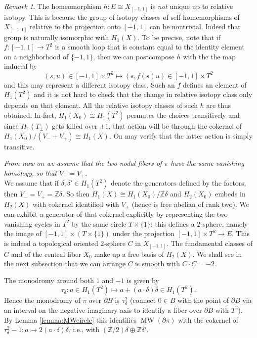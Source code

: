 \documentclass[10pt,letterpaper]{amsart}
\numberwithin{equation}{section}
\def\ZZ{{\mathbb Z}}
\newcommand{\p}{\partial}
\newcommand\MW{\operatorname{MW}}
\theoremstyle{remark}
\newtheorem{remark}[theorem]{Remark}
\begin{document}
\begin{remark}\label{rem:nonunique}
The homeomorphism $h:E\cong X_{[-1,1]}$ is \emph{not} unique up to relative isotopy. This is because the group of
 isotopy classes of self-homemorphisms of $X_{[-1,1]}$ relative to the projection onto $[-1,1]$ can be nontrivial. Indeed that group is naturally isomorphic with $H_1(X)$.
To be precise, note that if $f: [-1,1]\to T^2$ is a smooth loop that is  constant equal to the identity element on  a neighborhood of $\{-1,1\}$, then we can postcompose $h$ with the 
the map induced by 
\[
(s,  {u})\in [-1,1]\times T^2\mapsto (s, f(s){u})\in [-1,1]\times T^2
\]
and this may represent a different isotopy class. Such an $f$ defines an element of $H_1(T^2)$ and it is  
not hard to check that the change in relative isotopy class only depends on that element. 
All the relative isotopy classes  of such $h$ are thus obtained. In fact,  $H_1(X_0)\cong H_1(T^2)$ permutes the choices transitively  and 
since $H_1(T_\pm)$ gets killed over $\pm 1$, that action will be  through the cokernel of 
$H_1(X_0)/(V_-+V_+)\cong H_1(X)$. On may verify that the  latter action is simply transitive. 
\end{remark}

\emph{From now on we assume that the two nodal   fibers of $\pi$ have the same vanishing homology, so that $V_-=V_+$.} 
\\

We assume that  if  $\delta,\delta'\in H_1(T^2)$ denote the generators defined by the factors, then $V_-=V_+=\ZZ\delta$. So then $H_1(X)\cong H_1(X_0)/\ZZ \delta$ and  $H_2(X_0)$ embeds in $H_2(X)$ with cokernel identified with $V_+$ (hence is free abelian of rank two).  We  can  exhibit a generator of that cokernel explicitly  by representing the two vanishing cycles in $T^2$  by 
the same circle $T\times\{1\}$: this defines a   $2$-sphere, namely the image of $[-1,1]\times (T\times\{1\})$ under the projection $[-1,1]\times T^2\to E$. This is indeed a topological oriented $2$-sphere  $C$ in $X_{[-1,1]}$. The fundamental classes of $C$ and of the central fiber $X_0$ make up a free basis of $H_2(X)$. We shall see in the next subsection that we can arrange $C$ is smooth with $C\cdot C=-2$.


The monodromy around both $1$ and $-1$ is given by 
\[
\tau_{\delta}: a\in H_1(T^2)\mapsto a+(a\cdot \delta)\delta \in H_1(T^2).
\]
Hence the  monodromy of $\pi$ over $\p B$  is $\tau_{\delta}^2$ (connect $0\in B$ with the point of $\p B$ via an interval on the  negative imaginary axis to identify a fiber over $\p B$ with $T^2$). By Lemma \ref{lemma:MWcircle} this identifies $\MW(\p\pi)$ with 
the cokernel of $\tau_{\delta}^2-1: a\mapsto 2(a\cdot \delta)\delta$, i.e., with $(\ZZ/2)\delta\oplus  \ZZ\delta'$.
\end{document}
